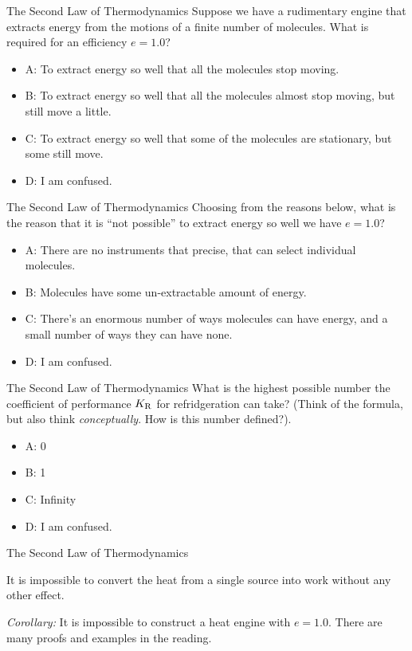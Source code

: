 \documentclass{beamer}
\begin{document}
\begin{frame}{The Second Law of Thermodynamics}
Suppose we have a rudimentary engine that extracts energy from the motions of a finite number of molecules.  What is required for an efficiency $e=1.0$?
\begin{itemize}
\item A: To extract energy so well that all the molecules stop moving.
\item B: To extract energy so well that all the molecules almost stop moving, but still move a little.
\item C: To extract energy so well that some of the molecules are stationary, but some still move.
\item D: I am confused.
\end{itemize}
\end{frame}

\begin{frame}{The Second Law of Thermodynamics}
Choosing from the reasons below, what is the reason that it is ``not possible'' to extract energy so well we have $e=1.0$?
\begin{itemize}
\item A: There are no instruments that precise, that can select individual molecules.
\item B: Molecules have some un-extractable amount of energy.
\item C: There's an enormous number of ways molecules can have energy, and a small number of ways they can have none.
\item D: I am confused.
\end{itemize}
\end{frame}

\begin{frame}{The Second Law of Thermodynamics}
What is the highest possible number the coefficient of performance $K_{\rm R}$ for refridgeration can take?  (Think of the formula, but also think \textit{conceptually}.  How is this number defined?).
\begin{itemize}
\item A: 0
\item B: 1
\item C: Infinity
\item D: I am confused.
\end{itemize}
\end{frame}

\begin{frame}{The Second Law of Thermodynamics}
\begin{tcolorbox}[colback=white,colframe=red!40!blue,title=The \textit{Kelvin Statement} of the Second Law of Thermodynamics]
\alert{It is impossible to convert the heat from a single source into work without any other effect.}
\end{tcolorbox}
\textit{Corollary:} It is impossible to construct a heat engine with $e=1.0$.  There are many proofs and examples in the reading.
\end{frame}
\end{document}
